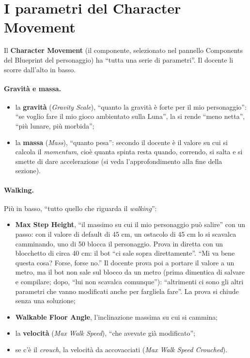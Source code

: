\section{I parametri del Character Movement}
\label{ue13:sec:cmc}

Il \textbf{Character Movement} (il componente, selezionato nel pannello Components del
Blueprint del personaggio) ha ``tutta una serie di parametri''. Il docente li scorre dall'alto
in basso.

\paragraph{Gravità e massa.}
\begin{itemize}
  \item la \textbf{gravità} (\emph{Gravity Scale}), ``quanto la gravità è forte per il mio
        personaggio'': ``se voglio fare il mio gioco ambientato sulla Luna'', la si rende
        ``meno netta'', ``più lunare, più morbida'';
  \item la \textbf{massa} (\emph{Mass}), ``quanto pesa'': secondo il docente è il valore
        su cui si calcola il \emph{momentum}, cioè quanta spinta resta quando, correndo, si
        salta e si smette di dare accelerazione (si veda l'approfondimento alla fine della
        sezione).
\end{itemize}

\paragraph{Walking.} Più in basso, ``tutto quello che riguarda il \emph{walking}'':
\begin{itemize}
  \item \textbf{Max Step Height}, ``il massimo su cui il mio personaggio può salire'' con
        un passo: con il valore di default di 45 cm, un ostacolo di 45 cm lo si scavalca
        camminando, uno di 50 blocca il personaggio. Prova in diretta con un blocchetto
        di circa 40 cm: il bot ``ci sale sopra direttamente''. ``Mi va bene questa cosa?
        Forse, forse no.'' Il docente prova poi a portare il valore a un metro, ma il bot
        non sale sul blocco da un metro (prima dimentica di salvare e compilare; dopo, ``lui
        non scavalca comunque''): ``altrimenti ci sono gli altri parametri che vanno
        modificati anche per fargliela fare''. La prova si chiude senza una soluzione;
  \item \textbf{Walkable Floor Angle}, l'inclinazione massima su cui si cammina;
  \item la \textbf{velocità} (\emph{Max Walk Speed}), ``che avevate già modificato'';
  \item se c'è il \emph{crouch}, la velocità da accovacciati (\emph{Max Walk Speed
        Crouched}).
\end{itemize}

